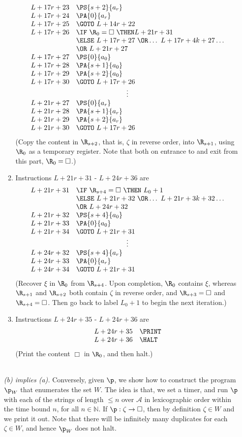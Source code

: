 \begin{enumerate}[1.]
\begin{enumerate}[(1)]
\[\begin{array}{rl}
L + 17r + 23 & \PS{s + 2}{a_r} \cr
L + 17r + 24 & \PA{0}{a_r} \cr
L + 17r + 25 & \GOTO \ L + 14r + 22 \cr
L + 17r + 26 & \IF \ \R_0 = \Box \ \THEN L + 21r + 31 \cr
\ & \ELSE \ L + 17r + 27 \ \OR \ldots \ L + 17r + 4k + 27 \ldots \cr
\ & \OR \ L + 21r + 27 \cr
L + 17r + 27 & \PS{0}{a_0} \cr
L + 17r + 28 & \PA{s + 1}{a_0} \cr
L + 17r + 29 & \PA{s + 2}{a_0} \cr
L + 17r + 30 & \GOTO \ L + 17r + 26 \cr
\multicolumn{2}{c}{\vdots} \cr
L + 21r + 27 & \PS{0}{a_r} \cr
L + 21r + 28 & \PA{s + 1}{a_r} \cr
L + 21r + 29 & \PA{s + 2}{a_r} \cr
L + 21r + 30 & \GOTO \ L + 17r + 26
\end{array}
\]
(Copy the content in $\R_{s + 2}$, that is, $\zeta$ in reverse order, into $\R_{s + 1}$, using $\R_0$ as a temporary register. Note that both on entrance to and exit from this part, $\R_0 = \Box$.)
\item Instructions $L + 21r + 31$ - $L + 24r + 36$ are
\[
\begin{array}{rl}
L + 21r + 31 & \IF \ \R_{s + 4} = \Box \ \THEN \ L_0 + 1 \cr
\ & \ELSE \ L + 21r + 32 \ \OR \ldots \ L + 21r + 3k + 32 \ldots \cr
\ & \OR \ L + 24r + 32 \cr
L + 21r + 32 & \PS{s + 4}{a_0} \cr
L + 21r + 33 & \PA{0}{a_0} \cr
L + 21r + 34 & \GOTO \ L + 21r + 31 \cr
\multicolumn{2}{c}{\vdots} \cr
L + 24r + 32 & \PS{s + 4}{a_r} \cr
L + 24r + 33 & \PA{0}{a_r} \cr
L + 24r + 34 & \GOTO \ L + 21r + 31
\end{array}
\]
(Recover $\xi$ in $\R_0$ from $\R_{s + 4}$. Upon completion, $\R_0$ contains $\xi$, whereas $\R_{s + 1}$ and $\R_{s + 2}$ both contain $\zeta$ in reverse order, and $\R_{s + 3} = \Box$ and $\R_{s + 4} = \Box$. Then go back to label $L_0 + 1$ to begin the next iteration.)
\item Instructions $L + 24r + 35$ - $L + 24r + 36$ are
\[
\begin{array}{rl}
L + 24r + 35 & \PRINT \cr
L + 24r + 36 & \HALT
\end{array}
\]
(Print the content $\Box$ in $\R_0$, and then halt.)
\end{enumerate}
\ \\
\emph{(b) implies (a).} Conversely, given $\p$, we show how to construct the program $\p_W$ that enumerates the set $W$. The idea is that, we set a timer, and run $\p$ with each of the strings of length $\leq n$ over $\mathcal{A}$ in lexicographic order within the time bound $n$, for all $n \in \mathbb{N}$. If $\p : \zeta \to \Box$, then by definition $\zeta \in W$ and we print it out. Note that there will be infinitely many duplicates for each $\zeta \in W$, and hence $\p_W$ does not halt.\\

\end{enumerate}
